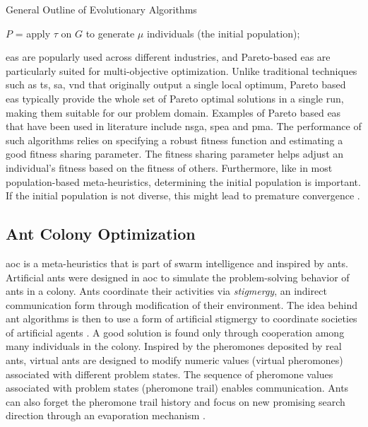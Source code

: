 \begin{algorithm}
  \caption{General Outline of Evolutionary Algorithms}\label{alg:ea}
  $P$ = apply $\tau$ on $G$ to generate $\mu$ individuals (the initial population);\\
  \end{algorithm}

\Glspl{ea} are popularly used across different industries, and Pareto-based \glspl{ea} are particularly suited for multi-objective optimization. Unlike traditional techniques such as \gls{ts}, \gls{sa}, \gls{vnd} that originally output a single local optimum, Pareto based \glspl{ea} typically provide the whole set of Pareto optimal solutions in a single run, making them suitable for our problem domain. Examples of Pareto based \glspl{ea} that have been used in literature include \gls{nsga}, \gls{spea} and \gls{pma}. The performance of such algorithms relies on specifying a robust fitness function and estimating a good fitness sharing parameter. The fitness sharing parameter helps adjust an individual's fitness based on the fitness of others. Furthermore, like in most population-based meta-heuristics, determining the initial population is important. If the initial population is not diverse, this might lead to premature convergence \parencite{Talbi2009Metaheuristics:Implementation}.

\subsection{Ant Colony Optimization}
\Gls{aoc} is a meta-heuristics that is part of swarm intelligence and inspired by ants. Artificial ants were designed in \gls{aoc} to simulate the problem-solving behavior of ants in a colony. Ants coordinate their activities via \textit{stigmergy}, an indirect communication form through modification of their environment. The idea behind ant algorithms is then to use a form of artificial stigmergy to coordinate societies of artificial agents \parencite{Dorigo2018TheMetaheuristic}. A good solution is found only through cooperation among many individuals in the colony. Inspired by the pheromones deposited by real ants, virtual ants are designed to modify numeric values (virtual pheromones) associated with different problem states. The sequence of pheromone values associated with problem states (pheromone trail) enables communication. Ants can also forget the pheromone trail history and focus on new promising search direction through an evaporation mechanism \parencite{Gonzalez2007HandbookMetaheuristics}. 


